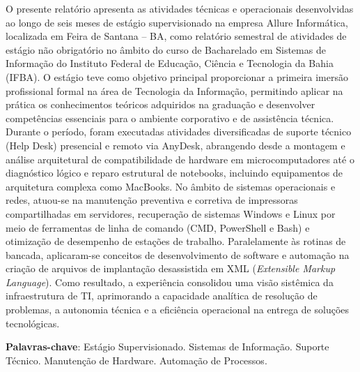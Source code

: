 \documentclass[12pt,openany,oneside,a4paper,brazil]{abntex2}
\renewcommand{\imprimircapa}{%
  \begin{capa}%
    \center
    {\ABNTEXchapterfont\large\imprimirinstituicao} %
    
    \vspace*{\fill}
    
    {\ABNTEXchapterfont\large\imprimirautor}
    
    \vspace*{\fill}
    \begin{center}
    \ABNTEXchapterfont\bfseries\LARGE\imprimirtitulo
    \end{center}
    \vspace*{\fill}
    
    {\large\imprimirlocal}
    \par
    {\large\imprimirdata}
    \vspace*{1cm}
  \end{capa}
}
\begin{document}
\pretextual
\imprimircapa
\imprimirfolhaderosto
\newpage
\begin{resumo}
O presente relatório apresenta as atividades técnicas e operacionais desenvolvidas ao longo de seis meses de estágio supervisionado na empresa Allure Informática, localizada em Feira de Santana -- BA, como relatório semestral de atividades de estágio não obrigatório no âmbito do curso de Bacharelado em Sistemas de Informação do Instituto Federal de Educação, Ciência e Tecnologia da Bahia (IFBA). O estágio teve como objetivo principal proporcionar a primeira imersão profissional formal na área de Tecnologia da Informação, permitindo aplicar na prática os conhecimentos teóricos adquiridos na graduação e desenvolver competências essenciais para o ambiente corporativo e de assistência técnica. Durante o período, foram executadas atividades diversificadas de suporte técnico (Help Desk) presencial e remoto via AnyDesk, abrangendo desde a montagem e análise arquitetural de compatibilidade de hardware em microcomputadores até o diagnóstico lógico e reparo estrutural de notebooks, incluindo equipamentos de arquitetura complexa como MacBooks. No âmbito de sistemas operacionais e redes, atuou-se na manutenção preventiva e corretiva de impressoras compartilhadas em servidores, recuperação de sistemas Windows e Linux por meio de ferramentas de linha de comando (CMD, PowerShell e Bash) e otimização de desempenho de estações de trabalho. Paralelamente às rotinas de bancada, aplicaram-se conceitos de desenvolvimento de software e automação na criação de arquivos de implantação desassistida em XML (\textit{Extensible Markup Language}). Como resultado, a experiência consolidou uma visão sistêmica da infraestrutura de TI, aprimorando a capacidade analítica de resolução de problemas, a autonomia técnica e a eficiência operacional na entrega de soluções tecnológicas.

\vspace{\onelineskip}
\noindent
\textbf{Palavras-chave}: Estágio Supervisionado. Sistemas de Informação. Suporte Técnico. Manutenção de Hardware. Automação de Processos.
\end{resumo}
\newpage
{}
\listoffigures*
\cleardoublepage
\setlength{\cftchapternumwidth}{1.2cm}
\setlength{\cftsectionnumwidth}{1.2cm}
\setlength{\cftlastnumwidth}{1.2cm}
\tableofcontents*

\textual
\end{document}
